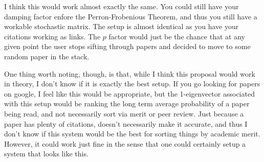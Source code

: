 \documentclass[11pt]{article}
\begin{document}
\begin{enumerate}
        I think this would work almost exactly the same. You could still have
        your damping factor enfore the Perron-Frobenious Theorem, and thus you
        still have a workable stochastic matrix. The setup is almost identical
        as you have your citations working as links. The $p$ factor would just
        be the chance that at any given point the user stops sifting through
        papers and decided to move to some random paper in the stack. 

        One thing worth noting, though, is that, while I think this proposal
        would work in theory, I don't know if it is exactly the best setup. If
        you go looking for papers on google, I feel like this would be
        appropriate, but the 1-eigenvector associated with this setup would be
        ranking the long term average probability of a paper being read, and
        not necessarily sort via merit or peer review. Just because a paper has
        plenty of citations, doesn't necessarily make it accurate, and thus I
        don't know if this system would be the best for sorting things by
        academic merit. However, it could work just fine in the sense that one
        could certainly setup a system that looks like this.
    \end{enumerate}
    
\end{document}

